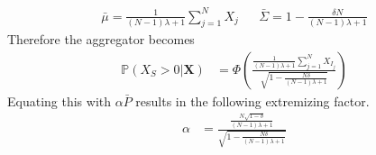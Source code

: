 \documentclass[11pt,twoside]{article}
\renewcommand{\P}{\mathbb{P}}
\theoremstyle{definition}
\theoremstyle{definition}
\begin{document}
\begin{align*}
\bar{\mu} = \frac{1}{(N-1)\lambda +1}  \sum_{j=1}^N X_j 
&&  \bar{\Sigma} = 1  - \frac{\delta N}{(N-1)\lambda +1} 
\end{align*}
Therefore the  aggregator becomes
\begin{align}
\P\left(X_S > 0 | \boldsymbol{X}\right) &=\Phi\left(\frac{\frac{1}{(N-1)\lambda +1} \sum_{j=1}^N X_{I_j} }{\sqrt{1- \frac{N\delta}{(N-1)\lambda +1} }}  \right) \label{CompoundAggre}
\end{align}
Equating this with $\alpha \bar{P}$ results in the following extremizing factor.
\begin{align}
\alpha &= \frac{\frac{N\sqrt{1-\delta}}{(N-1)\lambda +1}}{\sqrt{1- \frac{N\delta}{(N-1)\lambda +1} }} \label{CompoundAlpha}
\end{align}
\end{document}
